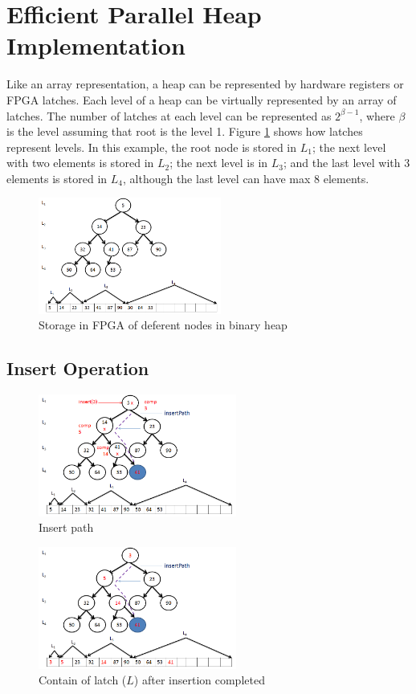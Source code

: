 \documentclass[10pt, conference, compsocconf]{IEEEtran}
\begin{document}
\section{Efficient Parallel Heap Implementation}
Like an array representation, a heap can be represented by hardware registers or FPGA latches.
Each level of a heap can be virtually represented by an array of latches.
The number of latches at each level can be represented as $2^{\beta-1}$, where $\beta$ is the level assuming that root is the level 1.
Figure \ref{fig5} shows how latches represent levels.
In this example, the root node is stored in $L_1$; the next level with two elements is stored in $L_2$; the next level is in $L_3$; and the last level with 3 elements is stored in $L_4$, although the last level can have max 8 elements.

\begin{figure}[!ht]
  \centering
  \includegraphics[width=6cm]{Figures/5.png}
      \caption{Storage in FPGA of deferent nodes in binary heap}
    \label{fig5}
\end{figure}

\subsection{Insert Operation}
\begin{figure}[!ht]
  \centering
  \includegraphics[width=6.5cm]{Figures/6.png}
      \caption{Insert path}
    \label{fig6}
\end{figure}

\begin{figure}[!ht]
  \centering
  \includegraphics[width=6.5cm]{Figures/7.png}
      \caption{Contain of latch ($L$) after insertion completed}
    \label{fig7}
\end{figure}
\end{document}
